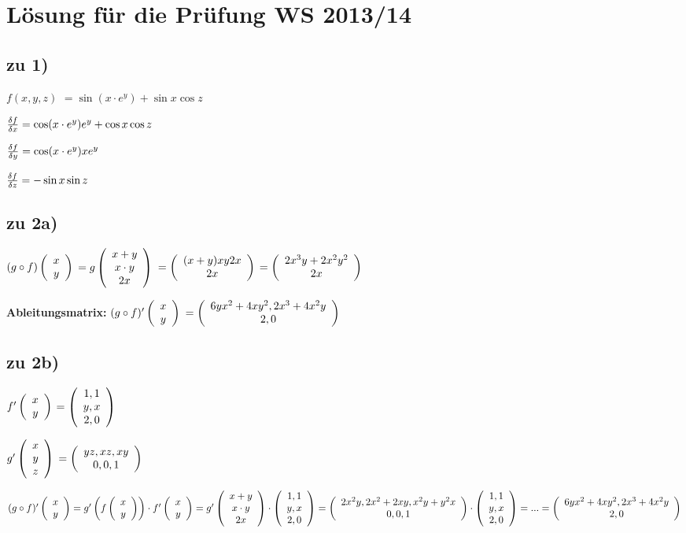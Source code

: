 \renewcommand{\ldate}{2015-12-17}


\section{Lösung für die Prüfung WS 2013/14}

\subsection{zu 1)}
$f(x,y,z)$
$=\sin(x\cdot e^y) + \sin x \cos z$

$\frac{\df}{\dx} = \cos (x\cdot e^y) e^y + \cos x \cos z$

$\frac{\df}{\dy} = \cos (x\cdot e^y) x e^y $

$\frac{\df}{\dz} = -\sin x \sin z$

\subsection{zu 2a)}
$ (g\circ f) \vektor{x\\y} $
$= g\vektor{x+y\\x\cdot y\\2x}$
$=\vektor{(x+y) x y 2 x \\ 2x}$
$=\vektor{2x^3y + 2x^2y^2\\2x}$

\textbf{Ableitungsmatrix:}
$ (g\circ f)' \vektor{x\\y} $
$=\vektor{6yx^2 + 4xy^2, 2x^3 + 4x^2y\\2, 0}$

\subsection{zu 2b)}
$f'\vektor{x\\y}$
$=\vektor{1,1\\y,x\\2,0}$

$g'\vektor{x\\y\\z}$
$=\vektor{yz, xz, xy\\0,0,1}$

$
(g\circ f)' \vektor{x\\y} 
=g' \rbr{f \vektor{x\\y}}  \cdot f'\vektor{x\\y}
=g'\vektor{x+y\\x\cdot y\\2x}  \cdot \vektor{1,1\\y,x\\2,0} 
=\vektor{2x^2y, 2x^2+2xy,x^2y+y^2x\\0,0,1} \cdot \vektor{1,1\\y,x\\2,0} 
=...=\vektor{6yx^2 + 4xy^2, 2x^3+4x^2y\\2,0}
$

